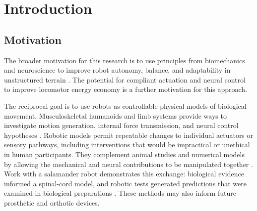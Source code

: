 \chapter{Introduction}\label{ch:introduction}
\graphicspath{{../Figures/10-introduction/}{figs/10-introduction/}}

\section{Motivation}

The broader motivation for this research is to use principles from biomechanics and neuroscience to improve robot autonomy, balance, and adaptability in unstructured terrain \citep{frey_legged_2026, ha_learning_2025, ijspeert_amphibious_2020}. The potential for compliant actuation and neural control to improve locomotor energy economy is a further motivation for this approach.

The reciprocal goal is to use robots as controllable physical models of biological movement. Musculoskeletal humanoids and limb systems provide ways to investigate motion generation, internal force transmission, and neural control hypotheses \citep{asano_design_2017, hitzmann_anthropomorphic_2018}. Robotic models permit repeatable changes to individual actuators or sensory pathways, including interventions that would be impractical or unethical in human participants. They complement animal studies and numerical models by allowing the mechanical and neural contributions to be manipulated together \citep{shin_constructive_2018, goldsmith_investigating_2021}. Work with a salamander robot demonstrates this exchange: biological evidence informed a spinal-cord model, and robotic tests generated predictions that were examined in biological preparations \citep{ijspeert_swimming_2007}. These methods may also inform future prosthetic and orthotic devices.

